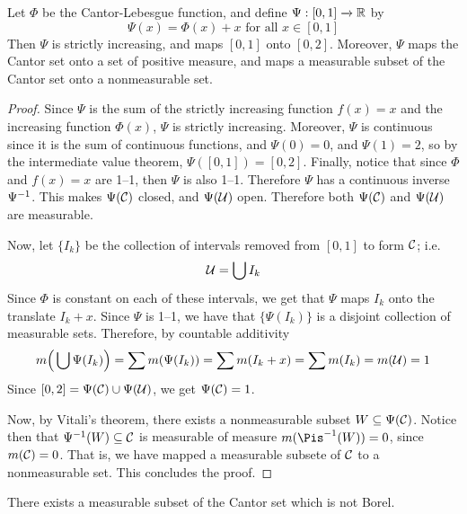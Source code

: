 \begin{lemma}\label{8.7.3}
    Let $\Phi$ be the Cantor-Lebesgue function, and define $\Psi:[0,1]
    \xrightarrow{} \mathbb{R}$ by
    \begin{equation*}
        \Psi(x)=\Phi(x)+x \text{ for all } x \in [0,1]
    \end{equation*}
    Then $\Psi$ is strictly increasing, and maps $[0,1]$ onto $[0,2]$. Moreover,
    $\Psi$ maps the Cantor set onto a set of positive measure, and maps a
    measurable subset of the Cantor set onto a nonmeasurable set.
\end{lemma}
\begin{proof}
    Since $\Psi$ is the sum of the strictly increasing function $f(x)=x$ and the
    increasing function $\Phi(x)$, $\Psi$ is strictly increasing. Moreover,
    $\Psi$ is continuous since it is the sum of continuous functions, and
    $\Psi(0)=0$, and $\Psi(1)=2$, so by the intermediate value theorem,
    $\Psi([0,1])=[0,2]$. Finally, notice that since $\Phi$ and $f(x)=x$ are
    1--1, then $\Psi$ is also 1--1. Therefore  $\Psi$ has a continuous inverse
    $\Psi^{-1}$. This makes $\Psi(\mathcal{C})$ closed, and $\Psi(\mathcal{U})$ open. Therefore
    both $\Psi(\mathcal{C})$ and $\Psi(\mathcal{U})$ are measurable.

    Now, let $\{I_k\}$ be the collection of intervals removed from $[0,1]$ to
    form $\mathcal{C}$; i.e.
    \begin{equation*}
        \mathcal{U}=\bigcup{I_k}
    \end{equation*}
    Since $\Phi$ is constant on each of these intervals, we get that  $\Psi$
    maps  $I_k$ onto the translate  $I_k+x$. Since $\Psi$ is 1--1, we have that
    $\{\Psi(I_k)\}$ is a disjoint collection of measurable sets. Therefore, by
    countable additivity
    \begin{equation*}
        m\Big{(} \bigcup{\Psi(I_k)} \Big{)}=\sum{m(\Psi(I_k))}=
        \sum{m(I_k+x)}=\sum{m(I_k)}=m(\mathcal{U})=1
    \end{equation*}
    Since $[0,2]=\Psi(\mathcal{C}) \cup \Psi(\mathcal{U})$, we get $\Psi(\mathcal{C})=1$.

    Now, by Vitali's theorem, there exists a nonmeasurable subset $W \subseteq
    \Psi(\mathcal{C})$. Notice then that $\Psi^{-1}(W) \subseteq \mathcal{C}$ is measurable of
    measure $m(\inv{\Pis}(W))=0$, since $m(\mathcal{C})=0$. That is, we have mapped a
    measurable subsete of $\mathcal{C}$ to a nonmeasurable set. This concludes the
    proof.
\end{proof}

\begin{theorem}\label{8.7.4}
    There exists a measurable subset of the Cantor set which is not Borel.
\end{theorem}
